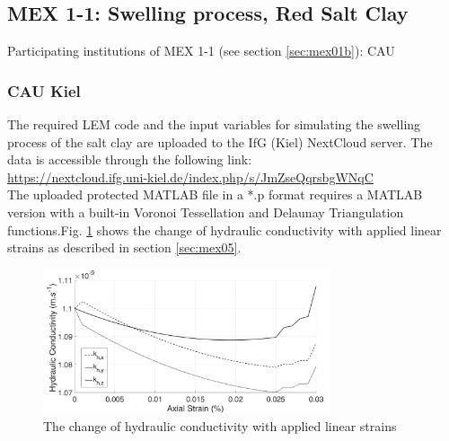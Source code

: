\subsection{MEX 1-1: Swelling process, Red Salt Clay}

Participating institutions of MEX 1-1 (see section \ref{sec:mex01b}): CAU



\subsubsection*{CAU Kiel}

The required LEM code and the input variables for simulating the swelling process of the salt clay are uploaded to the IfG (Kiel) NextCloud server. The data is accessible through the following link:\\
\hyperlink{https://nextcloud.ifg.uni-kiel.de/index.php/s/JmZseQqrsbgWNqC}{https://nextcloud.ifg.uni-kiel.de/index.php/s/JmZseQqrsbgWNqC}\\

The uploaded protected MATLAB file in a *.p format requires a MATLAB version with a built-in Voronoi Tessellation and Delaunay Triangulation functions.Fig. \ref{fig:Amir_ME5_Lattice_Drying_Data} shows the change of hydraulic conductivity with applied linear strains as described in section \ref {sec:mex05}. 

\begin{figure}[!ht]
\centering
\includegraphics[width=0.75\textwidth]{figures/Amir_ME5_Lattice_Drying_Data.png}
\caption{The change of hydraulic conductivity with applied linear strains}
\label{fig:Amir_ME5_Lattice_Drying_Data}
\end{figure}

